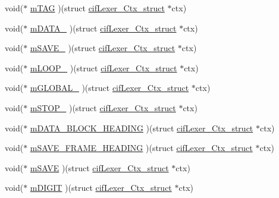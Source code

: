 \begin{DoxyCompactItemize}
\item 
void($\ast$ \hyperlink{structcif_lexer___ctx__struct_a42dfe1993d64101fc94d7b905e297bd5}{m\-T\-A\-G} )(struct \hyperlink{structcif_lexer___ctx__struct}{cif\-Lexer\-\_\-\-Ctx\-\_\-struct} $\ast$ctx)
\item 
void($\ast$ \hyperlink{structcif_lexer___ctx__struct_aa827a676c2985b284b8d86be6aa04738}{m\-D\-A\-T\-A\-\_\-} )(struct \hyperlink{structcif_lexer___ctx__struct}{cif\-Lexer\-\_\-\-Ctx\-\_\-struct} $\ast$ctx)
\item 
void($\ast$ \hyperlink{structcif_lexer___ctx__struct_a51609c9b67622c36fcd3f7c809279b61}{m\-S\-A\-V\-E\-\_\-} )(struct \hyperlink{structcif_lexer___ctx__struct}{cif\-Lexer\-\_\-\-Ctx\-\_\-struct} $\ast$ctx)
\item 
void($\ast$ \hyperlink{structcif_lexer___ctx__struct_aa989e62a85ac713e66b7dc2bcb7339e4}{m\-L\-O\-O\-P\-\_\-} )(struct \hyperlink{structcif_lexer___ctx__struct}{cif\-Lexer\-\_\-\-Ctx\-\_\-struct} $\ast$ctx)
\item 
void($\ast$ \hyperlink{structcif_lexer___ctx__struct_a029ba397cd601963bc8d8063d7f22e8c}{m\-G\-L\-O\-B\-A\-L\-\_\-} )(struct \hyperlink{structcif_lexer___ctx__struct}{cif\-Lexer\-\_\-\-Ctx\-\_\-struct} $\ast$ctx)
\item 
void($\ast$ \hyperlink{structcif_lexer___ctx__struct_ada5c0b457677b75f32e3c1d365793653}{m\-S\-T\-O\-P\-\_\-} )(struct \hyperlink{structcif_lexer___ctx__struct}{cif\-Lexer\-\_\-\-Ctx\-\_\-struct} $\ast$ctx)
\item 
void($\ast$ \hyperlink{structcif_lexer___ctx__struct_ae1d52c8de1f105728bb30e76a443a273}{m\-D\-A\-T\-A\-\_\-\-B\-L\-O\-C\-K\-\_\-\-H\-E\-A\-D\-I\-N\-G} )(struct \hyperlink{structcif_lexer___ctx__struct}{cif\-Lexer\-\_\-\-Ctx\-\_\-struct} $\ast$ctx)
\item 
void($\ast$ \hyperlink{structcif_lexer___ctx__struct_a885e4f60e392f0ddd2844e67ba35082e}{m\-S\-A\-V\-E\-\_\-\-F\-R\-A\-M\-E\-\_\-\-H\-E\-A\-D\-I\-N\-G} )(struct \hyperlink{structcif_lexer___ctx__struct}{cif\-Lexer\-\_\-\-Ctx\-\_\-struct} $\ast$ctx)
\item 
void($\ast$ \hyperlink{structcif_lexer___ctx__struct_ab1164391ddefd52288aecbdc136f92bf}{m\-S\-A\-V\-E} )(struct \hyperlink{structcif_lexer___ctx__struct}{cif\-Lexer\-\_\-\-Ctx\-\_\-struct} $\ast$ctx)
\item 
void($\ast$ \hyperlink{structcif_lexer___ctx__struct_a3ccc3fa0f6d4a69a40142220bd875a30}{m\-D\-I\-G\-I\-T} )(struct \hyperlink{structcif_lexer___ctx__struct}{cif\-Lexer\-\_\-\-Ctx\-\_\-struct} $\ast$ctx)

\end{DoxyCompactItemize}
